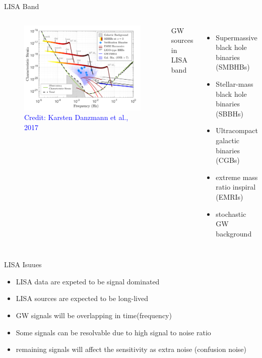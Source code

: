 \documentclass[pdf]{beamer}
\newcommand{\credit}[1]{\tiny{\textcolor{blue}{Credit: #1}}}
\begin{document}
\begin{frame}{LISA Band}
\begin{columns}
\vspace{1cm}

\begin{figure}
\includegraphics[scale=.13]{fig/observedLISA.png}
\caption*{\credit{Karsten Danzmann et al., 2017}}
\end{figure}
\vspace{1cm}

GW sources in LISA band
\begin{itemize}
\item Supermassive black hole binaries (SMBHBs)
\item Stellar-mass black hole binaries (SBBHs)
\item Ultracompact galactic binaries (CGBs)
\item extreme mass ratio inspiral (EMRIs)
\item stochastic GW background 
\end{itemize}
\end{columns}
\end{frame}

\begin{frame}{LISA Isuues}
\begin{itemize}
\item LISA data are expeted to be signal dominated
\item LISA sources are expected to be long-lived
\item GW signals will be overlapping in time(frequency)
\pause
\item Some signals can be resolvable due to high signal to noise ratio
\pause
\item remaining signals will affect the sensitivity as extra noise (confusion noise)
\end{itemize}
\end{frame}
\end{document}
